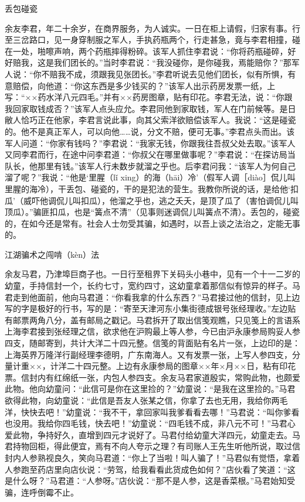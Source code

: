 \documentclass[12pt,UTF8]{ctexbook}
\begin{document}
丢包碰瓷


余友李君，年二十余岁，在商界服务，为人诚实。一日在柜上请假，归家有事。行至三岔路口，见一身穿制服之军人，手执药瓶两个，行走甚急，竟与李君相撞，碰在一处，啪嚓声响，两个药瓶摔得粉碎。该军人抓住李君说：“你将药瓶碰碎，好好赔我，这是我们团长的。”当时李君说：“我没碰你，是你碰我，焉能赔你？”那军人说：“你不赔我不成，须跟我见张团长。”李君听说去见他们团长，似有所惧，有意赔偿，向他道：“你这东西是多少钱买的？”该军人出示药房发票一纸，上写：“××药水洋八元四毛。”并有××药房图章，贴有印花。李君无法，说：“你跟我回家取钱成否？”该军人点头应允。李君同他到家取钱，军人在门前候等。是日敝人恰巧正在他家，李君言说此事，向其父索洋欲赔偿该军人。我说：“这是碰瓷的。他不是真正军人，可以向他……说，分文不赔，便可无事。”李君点头而出。该军人问道：“你家有钱吗？”李君说：“我家无钱，你跟我往吾叔父处去取。”该军人又同李君而行，在途中问李君道：“你叔父在哪里做事呢？”李君说：“在探访局当队长，他那里有钱。”该军人行未数步就溜之乎也。后李君问我：“该军人为何自己溜了呢？”我说：“他是‘里腥（lǐ xing）的海（hāi）冷’（假军人调［diào］侃儿叫里腥的海冷），干丢包、碰瓷的，干的是犯法的营生。我教你所说的话，是给他‘扣瓜’（威吓他调侃儿叫扣瓜），他溜之乎也，逃之夭夭，是顶了瓜了（害怕调侃儿叫顶瓜）。”骗匪扣瓜，也是“簧点不清”（见事则迷调侃儿叫簧点不清）。丢包的，碰瓷的，在如今还是常有。社会人士勿受其骗，如遇时，以吾上谈之法治之，定能无事的。





江湖骗术之闯啃（kèn）法


余友马君，乃津埠巨商子也。一日行至租界下关码头小巷中，见有一个十一二岁的幼童，手持信封一个，长约七寸，宽约四寸，这幼童拿着那信似有惊异的样子。马君走到他面前，他向马君道：“你看我拿的什么东西？”马君接过他的信封，见上边写的字是极好的行书，写的是：“寄至天津河东小集街德成银号张经理收。”左边贴有邮票两角八分，盖有邮局之戳记。马君拆开了取出信笺观瞧，只见笺上的言语系上海李君接到张经理之信，欲求他在沪购最上等人参，今已由沪永康参局购妥人参四支，随邮寄到，共计大洋二十四元整。信笺的背面贴有名片一张，上边印的是：上海英界万隆洋行副经理李德明，广东南海人。又有发票一张，上写人参四支，分量计重××，计洋二十四元整。上边有永康参局的图章××年×月××日，粘有印花票。信封内有红绵纸一张，内包人参四支。余友马君家道殷实，常购此物，也颇爱此物。他向幼童问：“此信可是你在这里捡的？”幼童说：“是我在这里捡的。”马君欲得此物，向幼童说：“此信是吾友人张某之信，你拿了去也无用，我给你两毛洋，快快去吧！”幼童说：“我不干，拿回家叫我爹看看去哪！”马君说：“叫你爹看也没用。我给你四毛钱，快去吧！”幼童说：“四毛钱不成，非八元不可！”马君心爱此物，争持好久，直增到四元才说好了。马君付给幼童大洋四元，幼童走去。马君持物回柜，得此便宜，焉有不向人夸示之理？有司账人王先生听他所说，取过信封内人参熟视良久，笑向马君道：“你上了当啦！叫人骗了！”马君似有觉悟，拿着人参跑至药店里向店伙说：“劳驾，给我看看此货成色如何？”店伙看了笑道：“这是什么呀？”马君道：“人参呀。”店伙说：“那不是人参，这是香菜根。”马君始知受骗，连呼倒霉不止。
\end{document}
